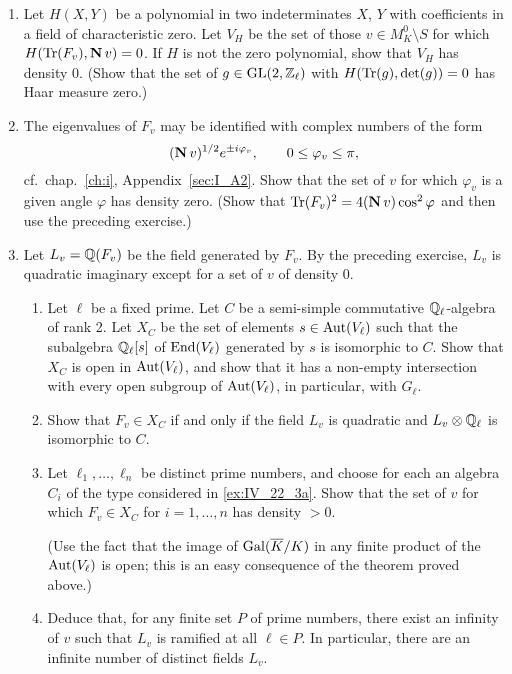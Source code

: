 \begin{enumerate}
\item Let $H(X, Y)$ be a polynomial in two indeterminates $X$, $Y$ with
	coefficients in a field of characteristic zero. Let $V_H$ be the set of
	those $v \in M_K^0 \setminus S$ for which $H(\operatorname{Tr}(F_v), \operatorname{\mathbf{N}} v) =
	0$. If $H$ is not the zero polynomial, show that $V_H$ has density 0.
	(Show that the set of $g \in \operatorname{GL}(2, \mathbb{Z}_\ell)$ with $H(\operatorname{Tr}(g), \det(g)) =
	0$ has Haar measure zero.)

\item The eigenvalues of $F_v$ may be identified with complex numbers of the
	form
	\[
		(\operatorname{\mathbf{N}} v)^{1/2} e^{\pm i \varphi_v},
		\qquad 0 \le \varphi_v \le \pi,
	\]
	cf.\ chap.~\ref{ch:i}, Appendix~\ref{sec:I_A2}. Show that the set of
	$v$ for which $\varphi_v$ is a given angle $\varphi$ has density zero.
	(Show that $\operatorname{Tr}(F_v)^2 = 4(\operatorname{\mathbf{N}} v)\cos^2 \varphi$ and then use the
	preceding exercise.)

\item Let $L_v = \mathbb{Q}(F_v)$ be the field generated by $F_v$. By the preceding
	\dpage
	exercise, $L_v$ is quadratic imaginary except for a set of $v$ of
	density 0.
	\begin{enumerate}
	\item\label{ex:IV_22_3a} Let $\ell$ be a fixed prime. Let $C$ be a semi-simple commutative
		$\mathbb{Q}_\ell$-algebra of rank 2. Let $X_C$ be the set of elements
		$s \in \operatorname{Aut}(V_\ell)$ such that the subalgebra $\mathbb{Q}_\ell[s]$ of
		$\operatorname{End}(V_\ell)$ generated by $s$ is isomorphic to $C$. Show that
		$X_C$ is open in $\operatorname{Aut}(V_\ell)$, and show that it has a
		non-empty intersection with every open subgroup of
		$\operatorname{Aut}(V_\ell)$, in particular, with $G_\ell$.
	\item Show that $F_v \in X_C$ if and only if the field $L_v$ is
		quadratic and $L_v \otimes \mathbb{Q}_\ell$ is isomorphic to $C$.
	\item Let $\ell_1, \dots, \ell_n$ be distinct prime numbers, and choose
		for each an algebra $C_i$ of the type considered in
		\ref{ex:IV_22_3a}. Show that the set of $v$ for which $F_v \in
		X_C$ for $i = 1, \dots, n$ has density $> 0$.

		(Use the fact that the image of $\operatorname{Gal}(\overline{K}/K)$ in any
		finite product of the $\operatorname{Aut}(V_\ell)$ is open; this is an easy
		consequence of the theorem proved above.)
	\item Deduce that, for any finite set $P$ of prime numbers, there exist
		an infinity of $v$ such that $L_v$ is ramified at all $\ell \in
		P$. In particular, there are an infinite number of distinct
		fields $L_v$.
	\end{enumerate}
\end{enumerate}

